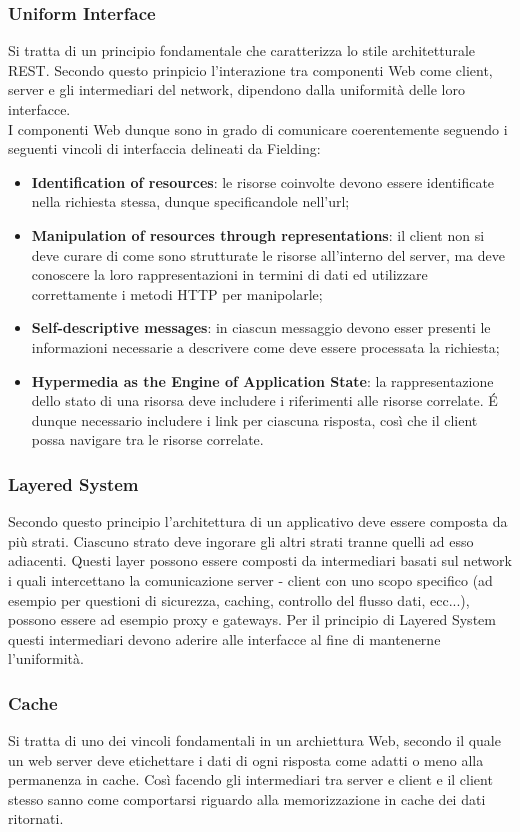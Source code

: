 \subsubsection*{Uniform Interface}
Si tratta di un principio fondamentale che caratterizza lo stile architetturale REST. Secondo questo prinpicio l'interazione tra componenti Web come client, server e gli intermediari del network, dipendono dalla uniformità delle loro interfacce.\\
I componenti Web dunque sono in grado di comunicare coerentemente seguendo i seguenti vincoli di interfaccia delineati da Fielding:
\begin{itemize}
  \item \textbf{Identification of resources}: le risorse coinvolte devono essere identificate nella richiesta stessa, dunque specificandole nell'url;
  \item \textbf{Manipulation of resources through representations}: il client non si deve curare di come sono strutturate le risorse all'interno del server, ma deve conoscere la loro rappresentazioni in termini di dati ed utilizzare correttamente i metodi HTTP per manipolarle;
  \item \textbf{Self-descriptive messages}: in ciascun messaggio devono esser presenti le informazioni necessarie a descrivere come deve essere processata la richiesta;
  \item \textbf{Hypermedia as the Engine of Application State}: la rappresentazione dello stato di una risorsa deve includere i riferimenti alle risorse correlate. É dunque necessario includere i link per ciascuna risposta, così che il client possa navigare tra le risorse correlate.
\end{itemize}
\subsubsection*{Layered System}
Secondo questo principio l'architettura di un applicativo deve essere composta da più strati. Ciascuno strato deve ingorare gli altri strati tranne quelli ad esso adiacenti. Questi layer possono essere composti da intermediari basati sul network i quali intercettano la comunicazione server - client con uno scopo specifico (ad esempio per questioni di sicurezza, caching, controllo del flusso dati, ecc...), possono essere ad esempio proxy e gateways. Per il principio di Layered System questi intermediari devono aderire alle interfacce al fine di mantenerne l'uniformità.
\subsubsection{Cache}
Si tratta di uno dei vincoli fondamentali in un archiettura Web, secondo il quale un web server deve etichettare i dati di ogni risposta come adatti o meno alla permanenza in cache. Così facendo gli intermediari tra server e client e il client stesso sanno come comportarsi riguardo alla memorizzazione in cache dei dati ritornati.
